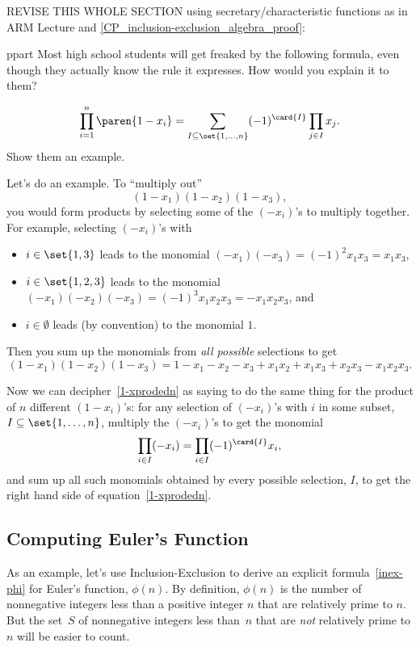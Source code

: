 \begin{editingnotes}
REVISE THIS WHOLE SECTION using secretary/characteristic functions as in ARM
Lecture and \ref{CP_inclusion-exclusion_algebra_proof}:

ppart Most high school students will get freaked by the following formula,
even though they actually know the rule it expresses.  How would you
explain it to them?

\begin{equation}\label{1-xprodedn}
\prod_{i=1}^n \paren{1-x_i} = \sum_{I \subseteq \set{1,\dots,n}} (-1)^{\card{I}}\prod_{j \in I}x_j.
\end{equation}
\hint Show them an example.

\begin{solution}
Let's do an example.  To ``multiply out''
\begin{equation}\label{x3prod}
(1-x_1)(1-x_2)(1-x_3),
\end{equation}
you would form \emph{} products by selecting some of the
$(-x_i)$'s to multiply together.  For example, selecting $(-x_i)$'s with
\begin{itemize}
\item $i \in \set{1,3}$ leads to the monomial $(-x_1)(-x_3) = (-1)^2x_1x_3
  = x_1x_3$,
\item $i \in \set{1,2,3}$ leads to the monomial $(-x_1)(-x_2)(-x_3)= (-1)^3x_1x_2x_3 = -x_1x_2x_3$, and
\item $i \in \emptyset$ leads (by convention) to the monomial $1$.
\end{itemize}
Then you sum up the monomials from \emph{all possible} selections to get
\[
(1-x_1)(1-x_2)(1-x_3) = 1 - x_1 - x_2 - x_3 + x_1x_2 + x_1x_3 + x_2x_3 - x_1x_2x_3.
\]

Now we can decipher~\eqref{1-xprodedn} as saying to do the same thing for
the product of $n$ different $(1-x_i)$'s:  for any selection of $(-x_i)$'s
with $i$ in some subset, $I \subseteq \set{1,\dots,n}$, multiply the
$(-x_i)$'s to get the monomial
\[
\prod_{i \in I} (-x_i) = \prod_{i \in I} (-1)^{\card{I}} x_i,
\]
and sum up all such monomials obtained by every possible selection, $I$,
to get the right hand side of equation~\eqref{1-xprodedn}.
\end{solution}

\end{editingnotes}

\subsection{Computing Euler's Function}
As an example, let's use Inclusion-Exclusion to derive an explicit
formula~\eqref{inex-phi} for Euler's function, $\phi(n)$.  By
definition, $\phi(n)$ is the number of nonnegative integers less than
a positive integer $n$ that are relatively prime to $n$.  But the
set~$S$ of nonnegative integers less than~$n$ that are \emph{not}
relatively prime to $n$ will be easier to count.

